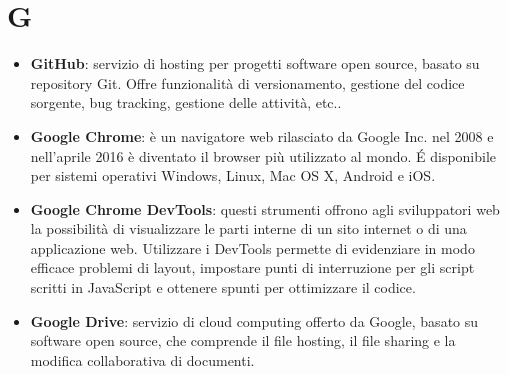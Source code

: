 \section{G}
\begin{itemize}
	\item \textbf{GitHub}: servizio di hosting per progetti software open source, basato su repository Git. Offre funzionalità di versionamento, gestione del codice sorgente, bug tracking, gestione delle attività, etc..
	\item \textbf{Google Chrome}: è un navigatore web rilasciato da Google Inc. nel 2008 e nell'aprile 2016 è diventato il browser più utilizzato al mondo. \'E disponibile per sistemi operativi Windows, Linux, Mac OS X, Android e iOS. 
	\item \textbf{Google Chrome DevTools}: questi strumenti offrono agli sviluppatori web la possibilità di visualizzare le parti interne di un sito internet o di una applicazione web. Utilizzare i DevTools permette di evidenziare in modo efficace problemi di layout, impostare punti di interruzione per gli script scritti in JavaScript e ottenere spunti per ottimizzare il codice.
	\item \textbf{Google Drive}: servizio di cloud computing offerto da Google, basato su software open source, che comprende il file hosting, il file sharing e la modifica collaborativa di documenti.
\end{itemize}
